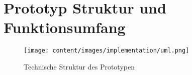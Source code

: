 \section{Prototyp Struktur und Funktionsumfang}

\begin{figure}[h]
  \centering
	\texttt{[image: content/images/implementation/uml.png]} 
  \caption{Technische Struktur des Prototypen}
  \label{fig:stereo-depth-map}
\end{figure}
